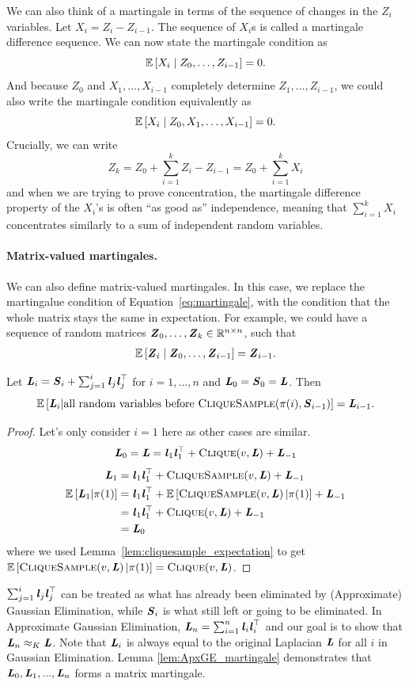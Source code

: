 We can also think of a martingale in terms of the sequence of changes
in the $Z_i$ variables.
Let $X_i = Z_i - Z_{i-1}$.
The sequence of $X_i$s is called a martingale difference sequence.
We can now state the martingale condition as
\[
  \E{X_i \mid Z_0, \ldots, Z_{i-1}} = 0
.
\]
And because $Z_0$ and $X_{1}, \ldots, X_{i-1}$ completely determine
$Z_1,  \ldots, Z_{i-1}$, we could also write
the martingale condition equivalently as
\[
  \E{X_i \mid Z_0, X_1, \ldots, X_{i-1}} = 0
  .
\]
Crucially, we can write
\[
Z_k = Z_0 + \sum_{i=1}^k Z_i - Z_{i-1} = Z_0 + \sum_{i=1}^k X_i
\]
and when we are trying to prove concentration, the martingale difference property
of the $X_i$'s is often ``as good as'' independence, meaning that
$\sum_{i=1}^k X_i$ concentrates similarly to a sum of independent
random variables.




\paragraph{Matrix-valued martingales.}
We can also define matrix-valued martingales.
In this case, we replace the martingalue condition of
Equation~\eqref{eq:martingale}, with the condition that the whole matrix
stays the same in expectation.
For example, we could have a sequence of random matrices $\ZZ_0, \ldots,
\ZZ_k \in \R^{n \times n}$, such that
\begin{align}
\label{eq:matmartingale}
  \E{\ZZ_i \mid \ZZ_0, \ldots, \ZZ_{i-1}} = \ZZ_{i-1}
.
\end{align}
\begin{lemma}\label{lem:ApxGE_martingale}
  Let $\LL_i = \SS_i + \sum_{j=1}^i \ll_j\ll_j^\trp$ for $i=1,...,n$ and $\LL_0=\SS_0=\LL$. Then
  \[ \E{\LL_i | \text{all random variables before } \vcliqsp{\pi(i)}{\SS_{i-1}} } = \LL_{i-1}. \]
\end{lemma}
\begin{proof}
  Let's only consider $i=1$ here as other cases are similar.
  \[ \LL_0 = \LL = \ll_1\ll_1^\trp + \vcliq{v}{\LL} + \LL_{-1} \]
  \begin{align*}
    \LL_1 &= \ll_1\ll_1^\trp + \vcliqsp{v}{\LL} + \LL_{-1} \\
    \E{\LL_1 | \pi(1)}
    &= \ll_1\ll_1^\trp + \E{\vcliqsp{v}{\LL}|\pi(1)} + \LL_{-1} \\
    &= \ll_1\ll_1^\trp + \vcliq{v}{\LL} + \LL_{-1} \\
    &= \LL_0
  \end{align*}
  where we used Lemma~\ref{lem:cliquesample_expectation} to get
  $\E{\vcliqsp{v}{\LL}|\pi(1)}  = \vcliq{v}{\LL} $.
\end{proof}
\begin{remark}
  $\sum_{j=1}^i \ll_j\ll_j^\trp$ can be treated as what has already been eliminated by (Approximate) Gaussian Elimination, while $\SS_i$ is what still left or going to be eliminated.
  In Approximate Gaussian Elimination, $\LL_n=\sum_{i=1}^n\ll_i\ll_i^\trp$ and our goal is to show that $\LL_n\approx_K\LL$.
  Note that $\LL_i$ is always equal to the original Laplacian $\LL$ for all $i$ in Gaussian Elimination.
  Lemma \ref{lem:ApxGE_martingale} demonstrates that $\LL_0,\LL_1,...,\LL_n$ forms a matrix martingale.
\end{remark}

